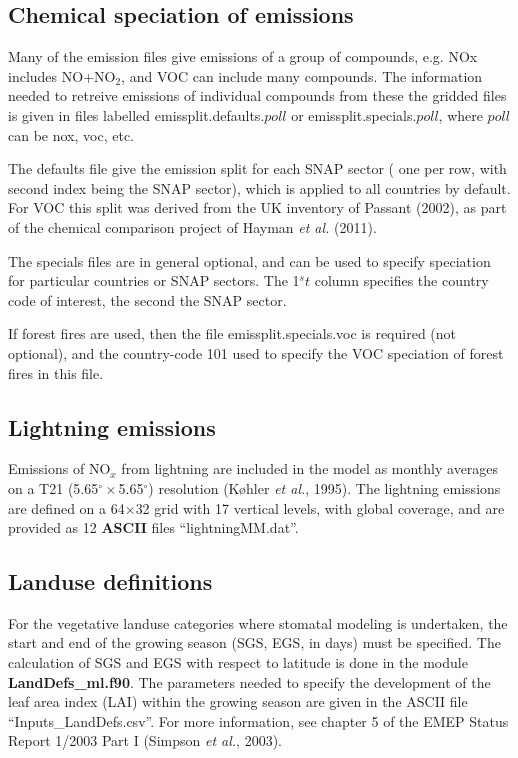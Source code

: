 \subsection{Chemical speciation of emissions}

Many of the emission files give emissions of a group of compounds, e.g.
NOx includes NO+NO$_2$, and VOC can include many compounds. The information
needed to retreive emissions of individual compounds from these the
gridded files is given in  files labelled emissplit.defaults.$poll$ or
emissplit.specials.$poll$, where $poll$ can be nox, voc, etc.

The defaults file give the emission split for each SNAP sector (
one per row, with second index being the SNAP sector), which
is applied to all countries by default. For VOC this split
was derived from the UK inventory of Passant (2002),
as part of the chemical comparison project of Hayman {\sl et al.} (2011).

The specials files are in general optional, and can be used to specify
speciation for particular countries or SNAP sectors. The
1${^st}$ column specifies the country code of interest, the second the SNAP sector. 

If forest fires are used, then the file emissplit.specials.voc is required
(not optional), and the country-code 101 used to specify the VOC speciation
of forest fires in this file.

\subsection{Lightning emissions}
Emissions of NO$_{x}$ from lightning are included in the model
as monthly averages on a T21 (5.65$^{\circ}\times$5.65$^{\circ}$) resolution (K{\o}hler {\sl et al.}, 1995). 
The lightning emissions are defined on a 64$\times$32 grid with 17 vertical
levels, with global coverage, and are provided as 12 {\bf ASCII} files
``lightningMM.dat''.

\subsection{Landuse definitions}
For the vegetative landuse categories where stomatal modeling is
undertaken, the start and end of the growing season (SGS, EGS, in days) must be specified. 
The calculation of SGS and EGS with respect to latitude is done 
in the module {\bf LandDefs\_ml.f90}. 
The parameters needed to specify the
development of the leaf area index (LAI) within the growing season
are given in the ASCII file ``Inputs\_LandDefs.csv''. 
For more information, see chapter 5  of the EMEP Status Report 1/2003 Part I (Simpson {\sl et al.}, 2003).


